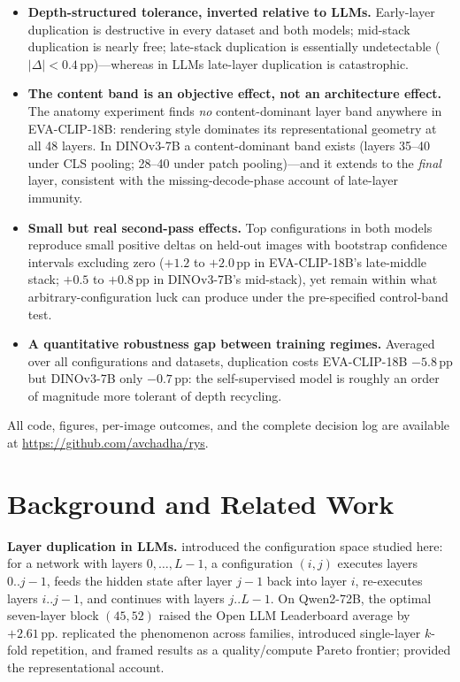 \documentclass{article}
\newcommand{\eva}{EVA-CLIP-18B}
\newcommand{\dino}{DINOv3-7B}
\newcommand{\pp}{\,\mathrm{pp}}
\begin{document}
\begin{itemize}
\item \textbf{Depth-structured tolerance, inverted relative to LLMs.}
Early-layer duplication is destructive in every dataset and both models;
mid-stack duplication is nearly free; late-stack duplication is
essentially undetectable ($|\Delta|<0.4\pp$)---whereas in LLMs
late-layer duplication is catastrophic.
\item \textbf{The content band is an objective effect, not an
architecture effect.} The anatomy experiment finds \emph{no}
content-dominant layer band anywhere in \eva{}: rendering style dominates
its representational geometry at all 48 layers. In \dino{} a
content-dominant band exists (layers 35--40 under CLS pooling; 28--40
under patch pooling)---and it extends to the \emph{final} layer,
consistent with the missing-decode-phase account of late-layer immunity.
\item \textbf{Small but real second-pass effects.} Top configurations in
both models reproduce small positive deltas on held-out images with
bootstrap confidence intervals excluding zero ($+1.2$ to $+2.0\pp$ in
\eva{}'s late-middle stack; $+0.5$ to $+0.8\pp$ in \dino{}'s mid-stack),
yet remain within what arbitrary-configuration luck can produce under the
pre-specified control-band test.
\item \textbf{A quantitative robustness gap between training regimes.}
Averaged over all configurations and datasets, duplication costs \eva{}
$-5.8\pp$ but \dino{} only $-0.7\pp$: the self-supervised model is
roughly an order of magnitude more tolerant of depth recycling.
\end{itemize}

All code, figures, per-image outcomes, and the complete decision log are
available at \url{https://github.com/avchadha/rys}.

\section{Background and Related Work}
\label{sec:related}

\textbf{Layer duplication in LLMs.} \citet{hankins2025rys} introduced the
configuration space studied here: for a network with layers
$0,\dots,L{-}1$, a configuration $(i,j)$ executes layers
$0..j{-}1$, feeds the hidden state after layer $j{-}1$ back into layer
$i$, re-executes layers $i..j{-}1$, and continues with layers $j..L{-}1$.
On Qwen2-72B, the optimal seven-layer block $(45,52)$ raised the Open LLM
Leaderboard average by $+2.61\pp$. \citet{hankins2025rysii} replicated
the phenomenon across families, introduced single-layer $k$-fold
repetition, and framed results as a quality/compute Pareto frontier;
\citet{hankins2025sapirwhorf} provided the representational account.
\end{document}
